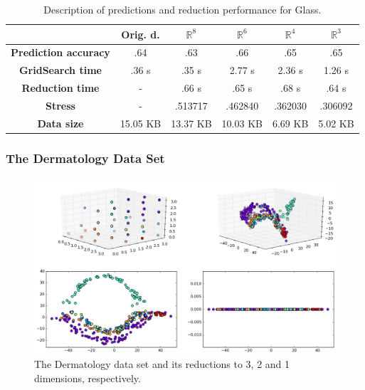 \documentclass[12pt]{article}
\begin{document}
\begin{table}[H]
	\centering
	\begin{tabular}{|c|c|c|c|c|c|}
		\hline
		& \textbf{Orig. d.} & \textbf{$\mathbb{R}^8$} & \textbf{$\mathbb{R}^6$} & \textbf{$\mathbb{R}^4$}  & \textbf{$\mathbb{R}^3$} \\\hline
		\textbf{Prediction accuracy}   & .64 & .63  & .66 & .65  & .65 \\\hline
		\textbf{GridSearch time} & .36 s & .35 s   & 2.77 s & 2.36 s & 1.26 s  \\\hline
		\textbf{Reduction time}  & -  & .66 s & .65 s & .68 s    & .64 s     \\\hline
		\textbf{Stress} & - & .513717 & .462840 & .362030 & .306092 \\\hline
		\textbf{Data size}          & 15.05 KB & 13.37 KB & 10.03 KB & 6.69 KB & 5.02 KB   \\\hline
	\end{tabular}
	
	\caption{Description of predictions and reduction performance for Glass.}
\end{table}

\newpage
\subsubsection{The Dermatology Data Set}

\begin{figure}[H]
	\centering
	\includegraphics[width=\linewidth]{experiments/2_5_dermatology_isomap}
	\captionsetup{justification=centering}
	\caption{The Dermatology data set and its reductions to 3, 2 and 1 dimensions, respectively.}
\end{figure}
\end{document}
